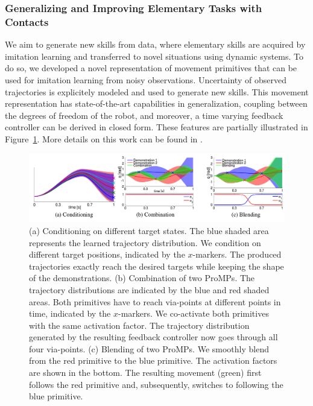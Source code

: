 \documentclass[final,5p,twocolumn]{elsarticle}
\begin{document}
\subsubsection{Generalizing and Improving Elementary Tasks with Contacts}

We aim to generate new skills from data, where elementary skills 
are acquired by imitation learning and transferred to novel situations using 
dynamic systems. To do so, we developed a novel representation of 
movement primitives that can be used for imitation learning from noisy observations.
Uncertainty of observed trajectories is explicitely modeled and used to generate new skills.
This movement representation has state-of-the-art capabilities in generalization, 
coupling between the degrees of freedom of the robot, and moreover, 
a time varying feedback controller can be derived in closed form. 
These features are partially illustrated in Figure~\ref{fig:promps}.
More details on this work can be found in \cite{Paraschos_NIPS_2013}.

\begin{figure}[!ht]
\centering
\includegraphics[width=\linewidth]{./images/ProMPs.png}
 \caption{(a)
Conditioning on different target states. The blue shaded area represents the learned
trajectory distribution. We condition on different target positions, indicated by the $x$-markers. The
produced trajectories exactly reach the desired targets while keeping the shape of the demonstrations.
(b)
Combination of two ProMPs. The trajectory distributions are indicated by the blue and red
shaded areas. Both primitives have to reach via-points at different points in time, indicated by
the $x$-markers. We co-activate both primitives with the same activation factor. The trajectory
distribution generated by the resulting feedback controller now goes through all four via-points.
(c)
Blending of two ProMPs. We smoothly blend from the red primitive to the blue primitive. The
activation factors are shown in the bottom. The resulting movement (green) first follows the red
primitive and, subsequently, switches to following the blue primitive.
}
\label{fig:promps}
\end{figure}
\end{document}

